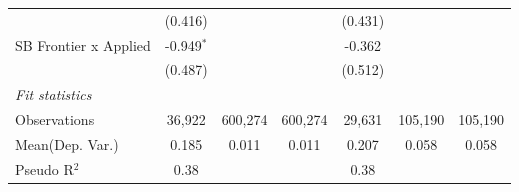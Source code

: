 \begin{tabular}{lcccccc}
                         & (0.416)       &         &         & (0.431)       &         &   \\   
   SB Frontier x Applied & -0.949$^{*}$  &         &         & -0.362        &         &   \\   
                         & (0.487)       &         &         & (0.512)       &         &   \\   
   \midrule
   \emph{Fit statistics}\\
   Observations          & 36,922        & 600,274 & 600,274 & 29,631        & 105,190 & 105,190\\  
Mean(Dep. Var.) & 0.185 & 0.011 & 0.011 & 0.207 & 0.058 & 0.058 \\
   Pseudo R$^2$          & 0.38          &         &         & 0.38          &         & \\  
   

\end{tabular}
